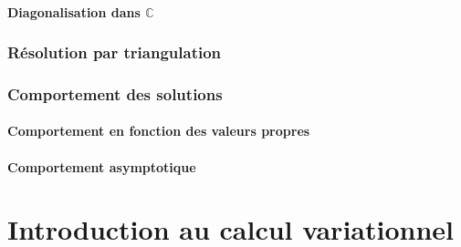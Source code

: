 \subsubsection{Diagonalisation dans $\mathbb{C}$}
\subsection{Résolution par triangulation}
\subsection{Comportement des solutions}
\subsubsection{Comportement en fonction des valeurs propres}
\subsubsection{Comportement asymptotique}
\chapter{Introduction au calcul variationnel}